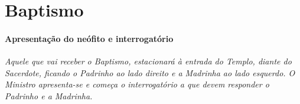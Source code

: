 \documentclass[a5paper,10pt]{scrbook}
\begin{document}

\setlength{\columnseprule}{0pt}
\setlength{\columnsep}{3mm}

\section{Baptismo}

\paragraph{Apresentação do neófito e interrogatório}

\textit{Aquele que vai receber o Baptismo, estacionará à entrada do Templo, diante do Sacerdote, ficando o Padrinho ao lado direito e a Madrinha ao lado esquerdo. O Ministro apresenta-se e começa o interrogatório a que devem responder o Padrinho e a Madrinha.}
\end{document}
